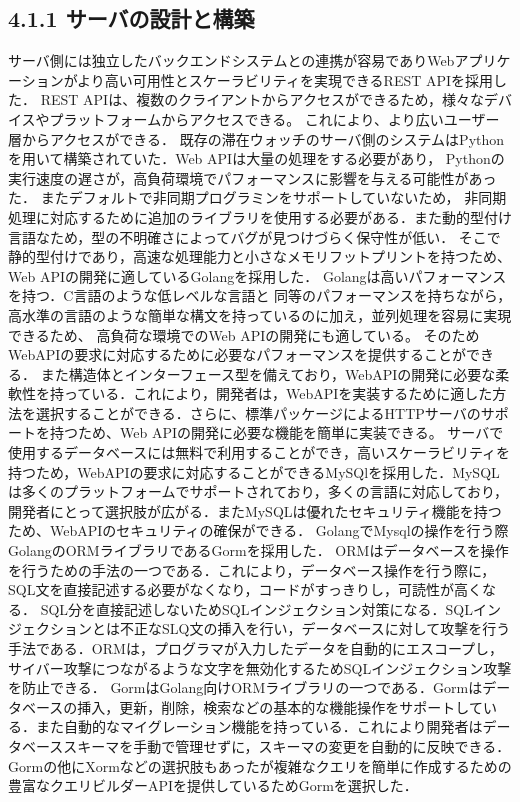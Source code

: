 \subsection*{4.1.1 サーバの設計と構築}
サーバ側には独立したバックエンドシステムとの連携が容易でありWebアプリケーションがより高い可用性とスケーラビリティを実現できるREST APIを採用した．
REST APIは、複数のクライアントからアクセスができるため，様々なデバイスやプラットフォームからアクセスできる。
これにより、より広いユーザー層からアクセスができる．
既存の滞在ウォッチのサーバ側のシステムはPythonを用いて構築されていた．Web APIは大量の処理をする必要があり，
Pythonの実行速度の遅さが，高負荷環境でパフォーマンスに影響を与える可能性があった．
またデフォルトで非同期プログラミンをサポートしていないため，
非同期処理に対応するために追加のライブラリを使用する必要がある．また動的型付け言語なため，型の不明確さによってバグが見つけづらく保守性が低い．
そこで静的型付けであり，高速な処理能力と小さなメモリフットプリントを持つため、Web APIの開発に適しているGolangを採用した．
Golangは高いパフォーマンスを持つ．C言語のような低レベルな言語と
同等のパフォーマンスを持ちながら，高水準の言語のような簡単な構文を持っているのに加え，並列処理を容易に実現できるため、
高負荷な環境でのWeb APIの開発にも適している。
そのためWebAPIの要求に対応するために必要なパフォーマンスを提供することができる．
また構造体とインターフェース型を備えており，WebAPIの開発に必要な柔軟性を持っている．これにより，開発者は，WebAPIを実装するために適した方法を選択することができる．さらに、標準パッケージによるHTTPサーバのサポートを持つため、Web APIの開発に必要な機能を簡単に実装できる。
サーバで使用するデータベースには無料で利用することができ，高いスケーラビリティを持つため，WebAPIの要求に対応することができるMySQlを採用した．MySQLは多くのプラットフォームでサポートされており，多くの言語に対応しており，開発者にとって選択肢が広がる．またMySQLは優れたセキュリティ機能を持つため、WebAPIのセキュリティの確保ができる．
GolangでMysqlの操作を行う際GolangのORMライブラリであるGormを採用した．
ORMはデータベースを操作を行うための手法の一つである．これにより，データベース操作を行う際に，SQL文を直接記述する必要がなくなり，コードがすっきりし，可読性が高くなる．
SQL分を直接記述しないためSQLインジェクション対策になる．SQLインジェクションとは不正なSLQ文の挿入を行い，データベースに対して攻撃を行う手法である．ORMは，プログラマが入力したデータを自動的にエスコープし，サイバー攻撃につながるような文字を無効化するためSQLインジェクション攻撃を防止できる．
GormはGolang向けORMライブラリの一つである．Gormはデータベースの挿入，更新，削除，検索などの基本的な機能操作をサポートしている．また自動的なマイグレーション機能を持っている．これにより開発者はデータベーススキーマを手動で管理せずに，スキーマの変更を自動的に反映できる．
Gormの他にXormなどの選択肢もあったが複雑なクエリを簡単に作成するための豊富なクエリビルダーAPIを提供しているためGormを選択した．





